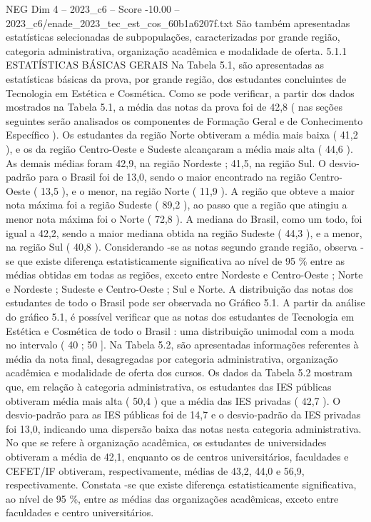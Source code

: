\begin{textsample}{NEG Dim 4 – 2023\_c6 – Score -10.00 – 2023\_c6/enade\_2023\_tec\_est\_cos\_60b1a6207f.txt}
São também apresentadas estatísticas selecionadas de subpopulações, caracterizadas por grande região, categoria administrativa, organização acadêmica e modalidade de oferta. 5.1.1 ESTATÍSTICAS BÁSICAS GERAIS Na Tabela 5.1, são apresentadas as estatísticas básicas da prova, por grande região, dos estudantes concluintes de Tecnologia em Estética e Cosmética.
Como se pode verificar, a partir dos dados mostrados na Tabela 5.1, a média das notas da prova foi de 42,8 ( nas seções seguintes serão analisados os componentes de Formação Geral e de Conhecimento Específico ).
Os estudantes da região Norte obtiveram a média mais baixa ( 41,2 ), e os da região Centro-Oeste e Sudeste alcançaram a média mais alta ( 44,6 ).
As demais médias foram 42,9, na região Nordeste ; 41,5, na região Sul.
O desvio-padrão para o Brasil foi de 13,0, sendo o maior encontrado na região Centro-Oeste ( 13,5 ), e o menor, na região Norte ( 11,9 ).
A região que obteve a maior nota máxima foi a região Sudeste ( 89,2 ), ao passo que a região que atingiu a menor nota máxima foi o Norte ( 72,8 ).
A mediana do Brasil, como um todo, foi igual a 42,2, sendo a maior mediana obtida na região Sudeste ( 44,3 ), e a menor, na região Sul ( 40,8 ).
Considerando -se as notas segundo grande região, observa -se que existe diferença estatisticamente significativa ao nível de 95 \% entre as médias obtidas em todas as regiões, exceto entre Nordeste e Centro-Oeste ; Norte e Nordeste ; Sudeste e Centro-Oeste ; Sul e Norte.
A distribuição das notas dos estudantes de todo o Brasil pode ser observada no Gráfico 5.1.
A partir da análise do gráfico 5.1, é possível verificar que as notas dos estudantes de Tecnologia em Estética e Cosmética de todo o Brasil : uma distribuição unimodal com a moda no intervalo ( 40 ; 50 ].
Na Tabela 5.2, são apresentadas informações referentes à média da nota final, desagregadas por categoria administrativa, organização acadêmica e modalidade de oferta dos cursos.
Os dados da Tabela 5.2 mostram que, em relação à categoria administrativa, os estudantes das IES públicas obtiveram média mais alta ( 50,4 ) que a média das IES privadas ( 42,7 ).
O desvio-padrão para as IES públicas foi de 14,7 e o desvio-padrão da IES privadas foi 13,0, indicando uma dispersão baixa das notas nesta categoria administrativa.
No que se refere à organização acadêmica, os estudantes de universidades obtiveram a média de 42,1, enquanto os de centros universitários, faculdades e CEFET/IF obtiveram, respectivamente, médias de 43,2, 44,0 e 56,9, respectivamente.
Constata -se que existe diferença estatisticamente significativa, ao nível de 95 \%, entre as médias das organizações acadêmicas, exceto entre faculdades e centro universitários.

\end{textsample}
